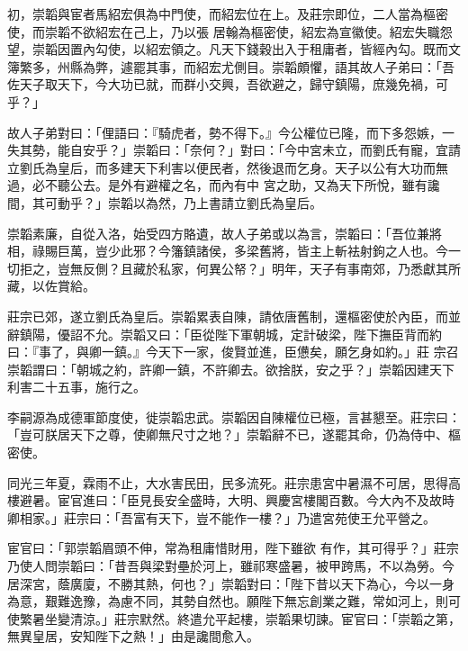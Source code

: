 \begin{pinyinscope}
 初，崇韜與宦者馬紹宏俱為中門使，而紹宏位在上。及莊宗即位，二人當為樞密使，而崇韜不欲紹宏在己上，乃以張
 居翰為樞密使，紹宏為宣徽使。紹宏失職怨望，崇韜因置內勾使，以紹宏領之。凡天下錢穀出入于租庸者，皆經內勾。既而文簿繁多，州縣為弊，遽罷其事，而紹宏尤側目。崇韜頗懼，語其故人子弟曰：「吾佐天子取天下，今大功已就，而群小交興，吾欲避之，歸守鎮陽，庶幾免禍，可乎？」



 故人子弟對曰：「俚語曰：『騎虎者，勢不得下。』今公權位已隆，而下多怨嫉，一失其勢，能自安乎？」崇韜曰：「奈何？」對曰：「今中宮未立，而劉氏有寵，宜請立劉氏為皇后，而多建天下利害以便民者，然後退而乞身。天子以公有大功而無過，必不聽公去。是外有避權之名，而內有中
 宮之助，又為天下所悅，雖有讒間，其可動乎？」崇韜以為然，乃上書請立劉氏為皇后。



 崇韜素廉，自從入洛，始受四方賂遺，故人子弟或以為言，崇韜曰：「吾位兼將相，祿賜巨萬，豈少此邪？今籓鎮諸侯，多梁舊將，皆主上斬袪射鉤之人也。今一切拒之，豈無反側？且藏於私家，何異公帑？」明年，天子有事南郊，乃悉獻其所藏，以佐賞給。



 莊宗已郊，遂立劉氏為皇后。崇韜累表自陳，請依唐舊制，還樞密使於內臣，而並辭鎮陽，優詔不允。崇韜又曰：「臣從陛下軍朝城，定計破梁，陛下撫臣背而約曰：『事了，與卿一鎮。』今天下一家，俊賢並進，臣憊矣，願乞身如約。」莊
 宗召崇韜謂曰：「朝城之約，許卿一鎮，不許卿去。欲捨朕，安之乎？」崇韜因建天下利害二十五事，施行之。



 李嗣源為成德軍節度使，徙崇韜忠武。崇韜因自陳權位已極，言甚懇至。莊宗曰：「豈可朕居天下之尊，使卿無尺寸之地？」崇韜辭不已，遂罷其命，仍為侍中、樞密使。



 同光三年夏，霖雨不止，大水害民田，民多流死。莊宗患宮中暑濕不可居，思得高樓避暑。宦官進曰：「臣見長安全盛時，大明、興慶宮樓閣百數。今大內不及故時卿相家。」莊宗曰：「吾富有天下，豈不能作一樓？」乃遣宮苑使王允平營之。



 宦官曰：「郭崇韜眉頭不伸，常為租庸惜財用，陛下雖欲
 有作，其可得乎？」莊宗乃使人問崇韜曰：「昔吾與梁對壘於河上，雖祁寒盛暑，被甲跨馬，不以為勞。今居深宮，蔭廣廈，不勝其熱，何也？」崇韜對曰：「陛下昔以天下為心，今以一身為意，艱難逸豫，為慮不同，其勢自然也。願陛下無忘創業之難，常如河上，則可使繁暑坐變清涼。」莊宗默然。終遣允平起樓，崇韜果切諫。宦官曰：「崇韜之第，無異皇居，安知陛下之熱！」由是讒間愈入。




\end{pinyinscope}
